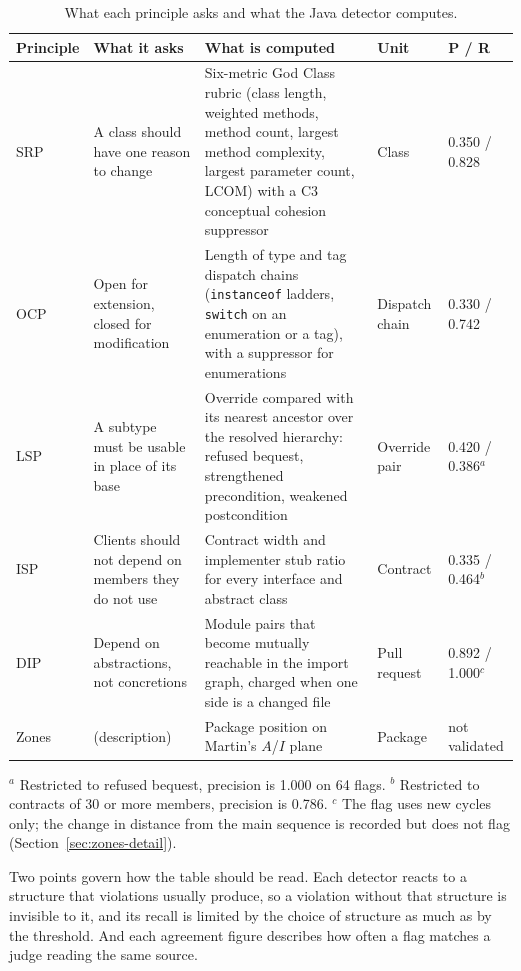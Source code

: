 \begin{table}[p]
\centering
\caption{What each principle asks and what the Java detector computes.}
\label{tab:principle-gap}
\small
\begin{tabular}{@{}L{1.6cm}L{2.3cm}L{5.4cm}L{1.4cm}L{2.6cm}@{}}
\toprule
\textbf{Principle} & \textbf{What it asks} & \textbf{What is computed} & \textbf{Unit} &
\textbf{P / R} \\
\midrule
SRP & A class should have one reason to change & Six-metric God Class rubric (class length,
weighted methods, method count, largest method complexity, largest parameter count, LCOM) with a
C3 conceptual cohesion suppressor & Class & 0.350 / 0.828 \\
OCP & Open for extension, closed for modification & Length of type and tag dispatch chains
(\texttt{instanceof} ladders, \texttt{switch} on an enumeration or a tag), with a suppressor for
enumerations & Dispatch chain & 0.330 / 0.742 \\
LSP & A subtype must be usable in place of its base & Override compared with its nearest ancestor
over the resolved hierarchy: refused bequest, strengthened precondition, weakened postcondition &
Override pair & 0.420 / 0.386$^a$ \\
ISP & Clients should not depend on members they do not use & Contract width and implementer stub
ratio for every interface and abstract class & Contract & 0.335 / 0.464$^b$ \\
DIP & Depend on abstractions, not concretions & Module pairs that become mutually reachable in the
import graph, charged when one side is a changed file & Pull request & 0.892 / 1.000$^c$ \\
Zones & (description) & Package position on Martin's $A$/$I$ plane & Package & not validated \\
\bottomrule
\end{tabular}

\vspace{4pt}
\footnotesize $^a$ Restricted to refused bequest, precision is 1.000 on 64 flags.
$^b$ Restricted to contracts of 30 or more members, precision is 0.786.
$^c$ The flag uses new cycles only; the change in distance from the main sequence is recorded but
does not flag (Section~\ref{sec:zones-detail}).
\end{table}

Two points govern how the table should be read. Each detector reacts to a structure that violations
usually produce, so a violation without that structure is invisible to it, and its recall is limited
by the choice of structure as much as by the threshold. And each agreement figure describes how often
a flag matches a judge reading the same source.

